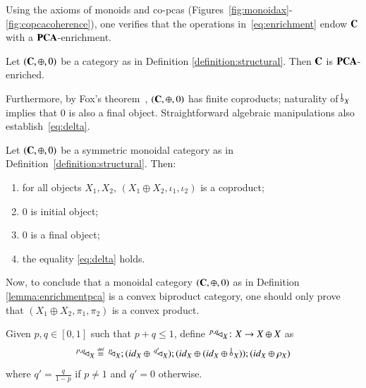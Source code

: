Using the axioms of monoids and co-pcas (Figures~\ref{fig:monoidax}-\ref{fig:copcacoherence}), one verifies that the operations in~\eqref{eq:enrichment} endow $\mathbf{C}$ with a $\mathbf{PCA}$-enrichment.

\begin{lemma}\label{lemma:enrichmentpca}
Let $(\mathbf{C}, \oplus, 0)$ be a category as in Definition \ref{definition:structural}.  
Then $\mathbf{C}$ is $\mathbf{PCA}$-enriched. %
\end{lemma}


Furthermore, by Fox's theorem~\cite{fox1976coalgebras}, $(\mathbf{C}, \oplus, 0)$ has finite coproducts; naturality of $\bangp{X}$ implies that $0$ is also a final object. Straightforward algebraic manipulations also establish~\eqref{eq:delta}.

\begin{lemma}\label{lemma:coproducts}
Let $(\mathbf{C},\oplus,0)$ be a symmetric monoidal category as in Definition~\ref{definition:structural}. %
Then:
\begin{enumerate} 
\item for all objects $X_1,X_2$, $(X_1\oplus X_2, \iota_1,\iota_2)$ is a coproduct;
\item $0$ is initial object;
\item $0$ is a final object;
\item the equality \eqref{eq:delta} holds.
\end{enumerate} 
\end{lemma}

Now, to conclude that a monoidal category $(\mathbf{C}, \oplus, 0)$ as in Definition \ref{lemma:enrichmentpca} is a convex biproduct category, one should only prove that $(X_1\oplus X_2,\pi_1,\pi_2)$ is a convex product. 

Given $p,q\in [0,1]$ such that $p+q\le 1$,  define $ ^{p,q\,}\!\! \lhd_{X}\colon X \to X\oplus X $  as  
\begin{equation}\label{diagpq generalizzata}
    \diaggen{p,q\,}{X} \defeq\,\diagp{X};(\id{X}\oplus\, \diaggen{q'}{X});(\id{X}\oplus (\id{X} \oplus\bang{X}));(\id{X}\oplus \runit{X})
\end{equation}
where $q'=\frac{q}{1-p}$ if $p\not= 1$ and $q'=0$ otherwise.

